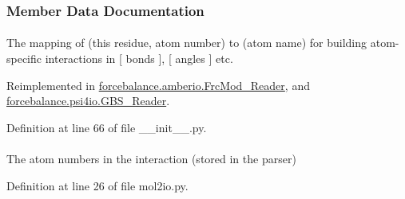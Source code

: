 \subsubsection{\-Member \-Data \-Documentation}
\hypertarget{classforcebalance_1_1BaseReader_a2c46ad6b66cf09a30e917ce4a1997e2a}{
\paragraph[{adict}]{}}\label{classforcebalance_1_1BaseReader_a2c46ad6b66cf09a30e917ce4a1997e2a}


\-The mapping of (this residue, atom number) to (atom name) for building atom-\/specific interactions in \mbox{[} bonds \mbox{]}, \mbox{[} angles \mbox{]} etc. 



\-Reimplemented in \hyperlink{classforcebalance_1_1amberio_1_1FrcMod__Reader_ae3b36131778cad32336f88fdb6d724ee}{forcebalance.\-amberio.\-Frc\-Mod\-\_\-\-Reader}, and \hyperlink{classforcebalance_1_1psi4io_1_1GBS__Reader_aa7cbae977f7e9a4e14ba1d45f62bb5fa}{forcebalance.\-psi4io.\-G\-B\-S\-\_\-\-Reader}.



\-Definition at line 66 of file \-\_\-\-\_\-init\-\_\-\-\_\-.\-py.

\hypertarget{classforcebalance_1_1mol2io_1_1Mol2__Reader_a9e4c477cef5943566d43dfa67b918691}{
\paragraph[{atom}]{}}\label{classforcebalance_1_1mol2io_1_1Mol2__Reader_a9e4c477cef5943566d43dfa67b918691}


\-The atom numbers in the interaction (stored in the parser) 



\-Definition at line 26 of file mol2io.\-py.

